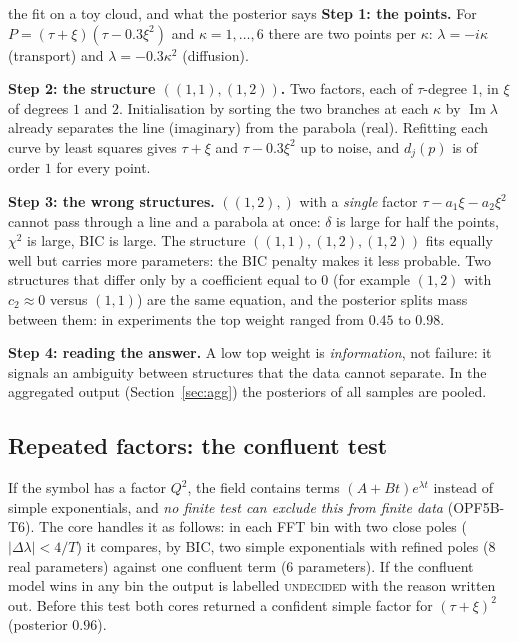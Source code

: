 \documentclass[11pt,a4paper]{article}
\theoremstyle{definition}
\begin{document}
\begin{explained}{the fit on a toy cloud, and what the posterior says}
\textbf{Step 1: the points.} For $P=(\tau+\xi)(\tau-0.3\xi^2)$ and $\kappa=1,\dots,6$ there are two points per $\kappa$: $\lambda=-i\kappa$ (transport) and $\lambda=-0.3\kappa^2$ (diffusion).

\medskip\textbf{Step 2: the structure $((1,1),(1,2))$.} Two factors, each of $\tau$-degree $1$, in $\xi$ of degrees $1$ and $2$. Initialisation by sorting the two branches at each $\kappa$ by $\operatorname{Im}\lambda$ already separates the line (imaginary) from the parabola (real). Refitting each curve by least squares gives $\tau+\xi$ and $\tau-0.3\xi^2$ up to noise, and $d_j(p)$ is of order $1$ for every point.

\medskip\textbf{Step 3: the wrong structures.} $((1,2),)$ with a \emph{single} factor $\tau-a_1\xi-a_2\xi^2$ cannot pass through a line and a parabola at once: $\delta$ is large for half the points, $\chi^2$ is large, BIC is large. The structure $((1,1),(1,2),(1,2))$ fits equally well but carries more parameters: the BIC penalty makes it less probable. Two structures that differ only by a coefficient equal to $0$ (for example $(1,2)$ with $c_2\approx0$ versus $(1,1)$) are the same equation, and the posterior splits mass between them: in experiments the top weight ranged from $0.45$ to $0.98$.

\medskip\textbf{Step 4: reading the answer.} A low top weight is \emph{information}, not failure: it signals an ambiguity between structures that the data cannot separate. In the aggregated output (Section~\ref{sec:agg}) the posteriors of all samples are pooled.
\end{explained}

\subsection{Repeated factors: the confluent test}\label{sec:confluent}
If the symbol has a factor $Q^2$, the field contains terms $(A+Bt)e^{\lambda t}$ instead of simple exponentials, and \emph{no finite test can exclude this from finite data} (OPF5B-T6). The core handles it as follows: in each FFT bin with two close poles ($|\Delta\lambda|<4/T$) it compares, by BIC, two simple exponentials with refined poles (8 real parameters) against one confluent term (6 parameters). If the confluent model wins in any bin the output is labelled \textsc{undecided} with the reason written out. Before this test both cores returned a confident simple factor for $(\tau+\xi)^2$ (posterior $0.96$).
\end{document}
